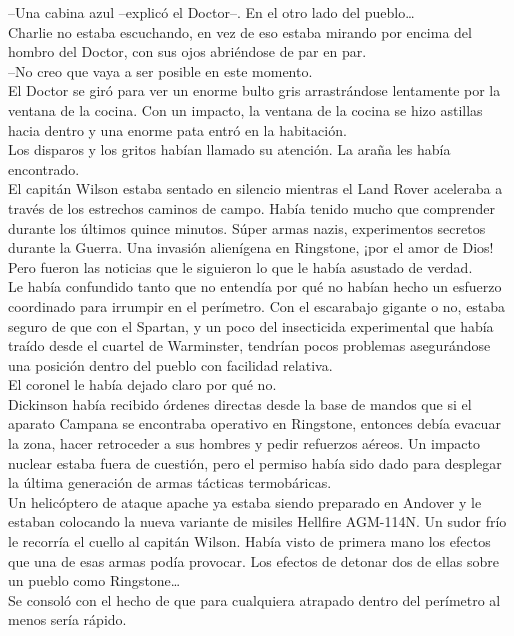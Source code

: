--Una cabina azul --explicó el Doctor--. En el otro lado del
pueblo\ldots{}\\
Charlie no estaba escuchando, en vez de eso estaba mirando por encima
del hombro del Doctor, con sus ojos abriéndose de par en par.\\
--No creo que vaya a ser posible en este momento.\\
El Doctor se giró para ver un enorme bulto gris arrastrándose lentamente
por la ventana de la cocina. Con un impacto, la ventana de la cocina se
hizo astillas hacia dentro y una enorme pata entró en la habitación.\\
Los disparos y los gritos habían llamado su atención. La araña les había
encontrado.\\[2\baselineskip]El capitán Wilson estaba sentado en
silencio mientras el Land Rover aceleraba a través de los estrechos
caminos de campo. Había tenido mucho que comprender durante los últimos
quince minutos. Súper armas nazis, experimentos secretos durante la
Guerra. Una invasión alienígena en Ringstone, ¡por el amor de Dios! Pero
fueron las noticias que le siguieron lo que le había asustado de
verdad.\\
Le había confundido tanto que no entendía por qué no habían hecho un
esfuerzo coordinado para irrumpir en el perímetro. Con el escarabajo
gigante o no, estaba seguro de que con el Spartan, y un poco del
insecticida experimental que había traído desde el cuartel de
Warminster, tendrían pocos problemas asegurándose una posición dentro
del pueblo con facilidad relativa.\\
El coronel le había dejado claro por qué no.\\
Dickinson había recibido órdenes directas desde la base de mandos que si
el aparato Campana se encontraba operativo en Ringstone, entonces debía
evacuar la zona, hacer retroceder a sus hombres y pedir refuerzos
aéreos. Un impacto nuclear estaba fuera de cuestión, pero el permiso
había sido dado para desplegar la última generación de armas tácticas
termobáricas.\\
Un helicóptero de ataque apache ya estaba siendo preparado en Andover y
le estaban colocando la nueva variante de misiles Hellfire AGM-114N. Un
sudor frío le recorría el cuello al capitán Wilson. Había visto de
primera mano los efectos que una de esas armas podía provocar. Los
efectos de detonar dos de ellas sobre un pueblo como Ringstone\ldots{}\\
Se consoló con el hecho de que para cualquiera atrapado dentro del
perímetro al menos sería rápido.\\
